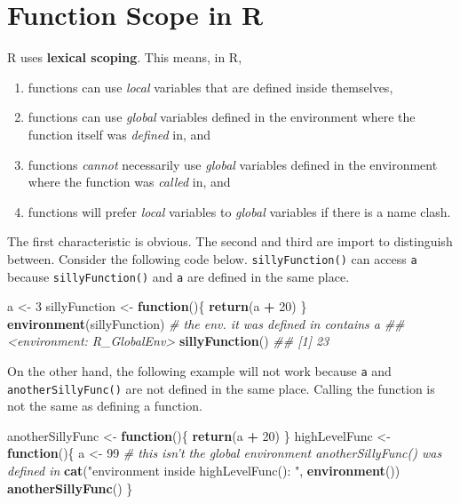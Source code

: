 \documentclass[12pt,krantz2]{krantz}
\makeatletter
\newenvironment{Shaded}{\begin{snugshade}}{\end{snugshade}}
\newcommand{\CommentTok}[1]{\textcolor[rgb]{0.37,0.37,0.37}{\textit{#1}}}
\newcommand{\ControlFlowTok}[1]{\textcolor[rgb]{0.27,0.27,0.27}{\textbf{#1}}}
\newcommand{\DecValTok}[1]{\textcolor[rgb]{0.06,0.06,0.06}{#1}}
\newcommand{\KeywordTok}[1]{\textcolor[rgb]{0.27,0.27,0.27}{\textbf{#1}}}
\newcommand{\NormalTok}[1]{#1}
\newcommand{\OperatorTok}[1]{\textcolor[rgb]{0.43,0.43,0.43}{\textbf{#1}}}
\newcommand{\StringTok}[1]{\textcolor[rgb]{0.5,0.5,0.5}{#1}}
\providecommand{\tightlist}{%
  \setlength{\itemsep}{0pt}\setlength{\parskip}{0pt}}
\newenvironment{kframe}{%
\medskip{}
\setlength{\fboxsep}{.8em}
 \def\at@end@of@kframe{}%
 \ifinner\ifhmode%
  \def\at@end@of@kframe{\end{minipage}}%
  \begin{minipage}{\columnwidth}%
 \fi\fi%
 \def\FrameCommand##1{\hskip\@totalleftmargin \hskip-\fboxsep
 \colorbox{shadecolor}{##1}\hskip-\fboxsep
     \hskip-\linewidth \hskip-\@totalleftmargin \hskip\columnwidth}%
 \MakeFramed {\advance\hsize-\width
   \@totalleftmargin\z@ \linewidth\hsize
   \@setminipage}}%
 {\par\unskip\endMakeFramed%
 \at@end@of@kframe}
\renewenvironment{Shaded}{\begin{kframe}}{\end{kframe}}
\makeatother
\begin{document}
\hypertarget{function-scope-in-r}{%
\section{Function Scope in R}\label{function-scope-in-r}}

R uses \textbf{lexical scoping}. This means, in R,

\begin{enumerate}
\def\labelenumi{\arabic{enumi}.}
\tightlist
\item
  functions can use \emph{local} variables that are defined inside themselves,\\
\item
  functions can use \emph{global} variables defined in the environment where the function itself was \emph{defined} in, and
\item
  functions \emph{cannot} necessarily use \emph{global} variables defined in the environment where the function was \emph{called} in, and
\item
  functions will prefer \emph{local} variables to \emph{global} variables if there is a name clash.
\end{enumerate}

The first characteristic is obvious. The second and third are import to distinguish between. Consider the following code below. \texttt{sillyFunction()} can access \texttt{a} because \texttt{sillyFunction()} and \texttt{a} are defined in the same place.

\begin{Shaded}
\begin{Highlighting}[]
\NormalTok{a <-}\StringTok{ }\DecValTok{3}
\NormalTok{sillyFunction <-}\StringTok{ }\ControlFlowTok{function}\NormalTok{()\{}
  \KeywordTok{return}\NormalTok{(a }\OperatorTok{+}\StringTok{ }\DecValTok{20}\NormalTok{) }
\NormalTok{\}}
\KeywordTok{environment}\NormalTok{(sillyFunction) }\CommentTok{# the env. it was defined in contains a}
\CommentTok{## <environment: R_GlobalEnv>}
\KeywordTok{sillyFunction}\NormalTok{()}
\CommentTok{## [1] 23}
\end{Highlighting}
\end{Shaded}

On the other hand, the following example will not work because \texttt{a} and \texttt{anotherSillyFunc()} are not defined in the same place. Calling the function is not the same as defining a function.

\begin{Shaded}
\begin{Highlighting}[]
\NormalTok{anotherSillyFunc <-}\StringTok{ }\ControlFlowTok{function}\NormalTok{()\{}
  \KeywordTok{return}\NormalTok{(a }\OperatorTok{+}\StringTok{ }\DecValTok{20}\NormalTok{) }
\NormalTok{\}}
\NormalTok{highLevelFunc <-}\StringTok{ }\ControlFlowTok{function}\NormalTok{()\{}
\NormalTok{  a <-}\StringTok{ }\DecValTok{99}
  \CommentTok{# this isn't the global environment anotherSillyFunc() was defined in}
  \KeywordTok{cat}\NormalTok{(}\StringTok{"environment inside highLevelFunc(): "}\NormalTok{, }\KeywordTok{environment}\NormalTok{())}
  \KeywordTok{anotherSillyFunc}\NormalTok{()}
\NormalTok{\}}
\end{Highlighting}
\end{Shaded}
\end{document}
